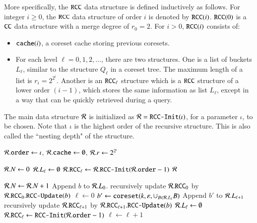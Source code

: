 More specifically, the $\texttt{RCC}$ data structure is defined inductively as
follows. For integer $i \ge 0$, the $\texttt{RCC}$ data structure of order $i$ is
denoted by $\texttt{RCC}(i)$. $\texttt{RCC}(0)$ is a $\texttt{CC}$ data structure with a merge
degree of $r_0 = 2$. For $i>0$, $\texttt{RCC}(i)$ consists of:
\begin{itemize}
\item $\texttt{cache}(i)$, a coreset cache storing previous coresets.

\item For each level $\ell = 0, 1, 2, \ldots$, there are two structures. 
One is a list of buckets $L_{\ell}$, 
similar to the structure $Q_{\ell}$ in a coreset tree. 
The maximum length of a list is $r_{i} = 2^{2^i}$. 
Another is an $\texttt{RCC}_{\ell}$ structure which is a $\texttt{RCC}$ 
structure of a lower order $(i-1)$, which stores the same information as list $L_\ell$, 
except in a way that can be quickly retrieved during a query.
\end{itemize}

The main data structure $\mathcal{R}$ is initialized as $\mathcal{R} = \texttt{RCC-Init}(\iota)$, 
for a parameter $\iota$, to be chosen. 
Note that $\iota$ is the highest order of the recursive structure. 
This is also called the ``nesting depth" of the structure. 

\begin{algorithm}[t]
\DontPrintSemicolon
\caption{$\mainds.\rccinit(\iota)$
\label{algo:rcc-init}
}
$\mathcal{R}.\texttt{order} \gets \iota$, 
$\mathcal{R}.\texttt{cache} \gets \emptyset$, 
$\mathcal{R}.r \gets 2^{2^{\iota}}$\;

$\mathcal{R}.N \gets 0$\; 
{
   $\mathcal{R}.L_{\ell} \gets \emptyset$\;
   {$\mathcal{R}.\texttt{RCC}_{\ell} \gets \mathcal{R}.\texttt{RCC-Init}(\mathcal{R}.\texttt{order} - 1)$}
}
\Return $\mathcal{R}$\;
\end{algorithm}

\begin{algorithm}[t]
\DontPrintSemicolon
\caption{$\mainds.\rccupdate(b)$
\label{algo:rcc-update}}
$\mathcal{R}.N \gets \mathcal{R}.N + 1$\;
Append $b$ to $\mathcal{R}.L_0$.\;
{
	recursively update $\mathcal{R}.\texttt{RCC}_0$ by $\mathcal{R}.\texttt{RCC}_0.\texttt{RCC-Update}(b)$ \;
}
\;
$\ell \gets 0$\;
{
  $b' \gets \texttt{coreset}(k, \varepsilon, \cup_{B \in \mathcal{R}.L_\ell} B)$ \;
  Append $b'$ to $\mathcal{R}.L_{\ell+1}$ \;
  {recursively update $\mathcal{R}.\texttt{RCC}_{\ell+1}$ by $\mathcal{R}.\texttt{RCC}_{\ell+1}.\texttt{RCC-Update}(b)$} \;
  $\mathcal{R}.L_{\ell} \gets \emptyset$ \;
  {$\mathcal{R}.\texttt{RCC}_{\ell} \gets \texttt{RCC-Init}(\mathcal{R}.\texttt{order}-1)$} \;
  $\ell \gets \ell + 1$ \;
}
\end{algorithm}

